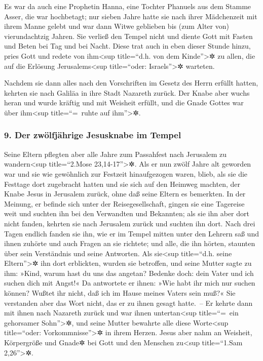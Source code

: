  Es war da auch eine Prophetin Hanna, eine Tochter
Phanuels aus dem Stamme Asser, die war hochbetagt; nur sieben Jahre
hatte sie nach ihrer Mädchenzeit mit ihrem Manne gelebt 
und war dann Witwe geblieben bis (zum Alter von) vierundachtzig Jahren.
Sie verließ den Tempel nicht und diente Gott mit Fasten und Beten bei
Tag und bei Nacht.  Diese trat auch in eben dieser Stunde
hinzu, pries Gott und redete von ihm\textless sup title=``d.h. von dem
Kinde''\textgreater✲ zu allen, die auf die Erlösung
Jerusalems\textless sup title=``oder: Israels''\textgreater✲ warteten.

 Nachdem sie dann alles nach den Vorschriften im Gesetz
des Herrn erfüllt hatten, kehrten sie nach Galiläa in ihre Stadt
Nazareth zurück.  Der Knabe aber wuchs heran und wurde
kräftig und mit Weisheit erfüllt, und die Gnade Gottes war über
ihm\textless sup title=``=~ruhte auf ihm''\textgreater✲.

\hypertarget{der-zwuxf6lfjuxe4hrige-jesusknabe-im-tempel}{%
\subsubsection{9. Der zwölfjährige Jesusknabe im
Tempel}\label{der-zwuxf6lfjuxe4hrige-jesusknabe-im-tempel}}

 Seine Eltern pflegten aber alle Jahre zum Passahfest
nach Jerusalem zu wandern\textless sup title=``2.Mose
23,14-17''\textgreater✲.  Als er nun zwölf Jahre alt
geworden war und sie wie gewöhnlich zur Festzeit hinaufgezogen waren,
 blieb, als sie die Festtage dort zugebracht hatten und
sie sich auf den Heimweg machten, der Knabe Jesus in Jerusalem zurück,
ohne daß seine Eltern es bemerkten.  In der Meinung, er
befinde sich unter der Reisegesellschaft, gingen sie eine Tagereise weit
und suchten ihn bei den Verwandten und Bekannten;  als
sie ihn aber dort nicht fanden, kehrten sie nach Jerusalem zurück und
suchten ihn dort.  Nach drei Tagen endlich fanden sie
ihn, wie er im Tempel mitten unter den Lehrern saß und ihnen zuhörte und
auch Fragen an sie richtete;  und alle, die ihn hörten,
staunten über sein Verständnis und seine Antworten.  Als
sie\textless sup title=``d.h. seine Eltern''\textgreater✲ ihn dort
erblickten, wurden sie betroffen, und seine Mutter sagte zu ihm: »Kind,
warum hast du uns das angetan? Bedenke doch: dein Vater und ich suchen
dich mit Angst!«  Da antwortete er ihnen: »Wie habt ihr
mich nur suchen können? Wußtet ihr nicht, daß ich im Hause meines Vaters
sein muß?«  Sie verstanden aber das Wort nicht, das er zu
ihnen gesagt hatte.~--  Er kehrte dann mit ihnen nach
Nazareth zurück und war ihnen untertan\textless sup title=``=~ein
gehorsamer Sohn''\textgreater✲, und seine Mutter bewahrte alle diese
Worte\textless sup title=``oder: Vorkommnisse''\textgreater✲ in ihrem
Herzen.  Jesus aber nahm an Weisheit, Körpergröße und
Gnade✲ bei Gott und den Menschen zu\textless sup title=``1.Sam
2,26''\textgreater✲.

